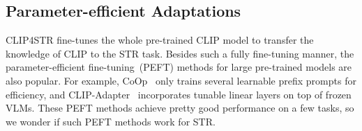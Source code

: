 \documentclass[lettersize,journal]{IEEEtran}
\begin{document}
\begin{table}[!t]
    \centering
    \caption{\textbf{Parameter-efficient adaptations}.
    \#Params means the learnable parameters in the visual encoder.
    $r$ is the feature reduction ratio in LST.
    Here we only show the results of the visual branch in CLIP4STR-B,
    and the cross-modal branch is ignored.
    }
    \setlength\tabcolsep{3pt}
  \label{tab:adapter}
\end{table} 
\subsection{Parameter-efficient Adaptations}
CLIP4STR fine-tunes the whole pre-trained CLIP model to transfer the knowledge of CLIP to the STR task.
Besides such a fully fine-tuning manner, the parameter-efficient fine-tuning~(PEFT) methods for large pre-trained models are also popular.
For example, CoOp~\cite{zhou2021coop} only trains several learnable prefix prompts for efficiency, and CLIP-Adapter~\cite{2021_gao_clip_adapter} incorporates tunable linear layers on top of frozen VLMs.
These PEFT methods achieve pretty good performance on a few tasks, so we wonder if such PEFT methods work for STR.
\end{document}

